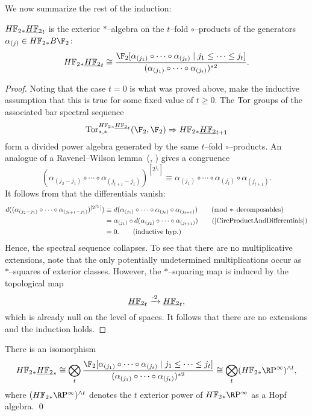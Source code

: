 We now summarize the rest of the induction:
\begin{theorem}\label{UnstableSteenrodInduction}
\(\HFtwo_* \OS{\HFtwo}{t}\) is the exterior \(\ast\)--algebra on the \(t\)--fold \(\circ\)--products of the generators \(\alpha_{(j)} \in \HFtwo_* B\F_2\): \[\HFtwo_* \OS{\HFtwo}{t} \cong \frac{\F_2[\alpha_{(j_1)} \circ \cdots \circ \alpha_{(j_t)} \mid j_1 \le \cdots \le j_t]}{(\alpha_{(j_1)} \circ \cdots \circ \alpha_{(j_t)})^{\ast 2}}.\]
\end{theorem}
\begin{proof}
Noting that the case \(t = 0\) is what was proved above, make the inductive assumption that this is true for some fixed value of \(t \ge 0\).  The \(\operatorname{Tor}\) groups of the associated bar spectral sequence \[\Tor^{\HFtwo_* \OS{\HFtwo}{t}}_{*, *}(\F_2, \F_2) \Rightarrow \HFtwo_* \OS{\HFtwo}{t+1}\] form a divided power algebra generated by the same \(t\)--fold \(\circ\)--products.  An analogue of a Ravenel--Wilson lemma~(\cite[Lemma 9.5]{RavenelWilsonKthyOfEMSpaces}, \cite[Claim 8.16]{Wilson}) gives a congruence \[(\alpha_{(j_2-j_1)} \circ \cdots \circ \alpha_{(j_{t+1}-j_1)})^{[2^{j_1}]} \equiv \alpha_{(j_1)} \circ \cdots \circ \alpha_{(j_t)} \circ \alpha_{(j_{t+1})} \tag{mod \(\ast\)--decomposables}.\]  It follows from  that the differentials vanish:
\begin{align*}
d((\alpha_{(j_2-j_1)} \circ \cdots \circ \alpha_{(j_{t+1}-j_1)})^{[2^{j_1}]}) & \equiv d(\alpha_{(j_1)} \circ \cdots \circ \alpha_{(j_t)} \circ \alpha_{(j_{t+1})}) \tag{mod \(\ast\)--decomposables} \\
& = \alpha_{(j_1)} \circ d(\alpha_{(j_2)} \circ \cdots \circ \alpha_{(j_{t+1})}) \tag{\Cref{CircProductAndDifferentials}} \\
& = 0. \tag{inductive hyp.}
\end{align*}
Hence, the spectral sequence collapses.  To see that there are no multiplicative extensions, note that the only potentially undetermined multiplications occur as \(\ast\)--squares of exterior classes.  However, the \(\ast\)--squaring map is induced by the topological map \[\OS{\HFtwo}{t} \xrightarrow{\cdot 2} \OS{\HFtwo}{t},\] which is already null on the level of spaces.  It follows that there are no extensions and the induction holds.
\end{proof}

\begin{corollary}\label{CalculationOfUnstableSteenrodHopfRing}
There is an isomorphism
\[\HFtwo_* \OS{\HFtwo}{*} \cong \bigotimes_t \frac{\F_2[\alpha_{(j_1)} \circ \cdots \circ \alpha_{(j_t)} \mid j_1 \le \cdots \le j_t]}{(\alpha_{(j_1)} \circ \cdots \circ \alpha_{(j_t)})^{\ast 2}} \cong \bigotimes_t (\HFtwo_* \RP^\infty)^{\sm t},\] where \((\HFtwo_* \RP^\infty)^{\sm t}\) denotes the \(t\){\th} exterior power of \(\HFtwo_* \RP^\infty\) as a Hopf algebra. \qed
\end{corollary}

